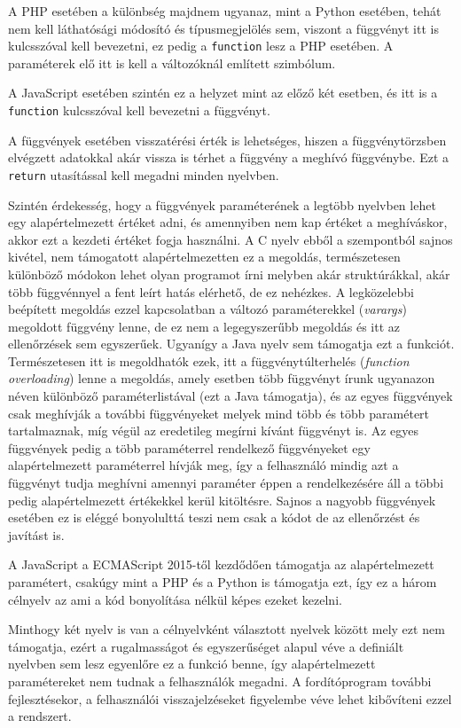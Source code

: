 A PHP esetében a különbség majdnem ugyanaz, mint a Python esetében, tehát nem kell láthatósági módosító és típusmegjelölés sem, viszont a függvényt itt is kulcsszóval kell bevezetni, ez pedig a \texttt{function} lesz a PHP esetében. A paraméterek elő itt is kell a változóknál említett \textdollar szimbólum.

A JavaScript esetében szintén ez a helyzet mint az előző két esetben, és itt is a \texttt{function} kulcsszóval kell bevezetni a függvényt.

A függvények esetében visszatérési érték is lehetséges, hiszen a függvénytörzsben elvégzett adatokkal akár vissza is térhet a függvény a meghívó függvénybe. Ezt a \texttt{return} utasítással kell megadni minden nyelvben.

Szintén érdekesség, hogy a függvények paraméterének a legtöbb nyelvben lehet egy alapértelmezett értéket adni, és amennyiben nem kap értéket a meghíváskor, akkor ezt a kezdeti értéket fogja használni.
A C nyelv ebből a szempontból sajnos kivétel, nem támogatott alapértelmezetten ez a megoldás, természetesen különböző módokon lehet olyan programot írni melyben akár struktúrákkal, akár több függvénnyel a fent leírt hatás elérhető, de ez nehézkes. A legközelebbi beépített megoldás ezzel kapcsolatban a változó paraméterekkel (\textit{varargs}) megoldott függvény lenne, de ez nem a legegyszerűbb megoldás és itt az ellenőrzések sem egyszerűek.
Ugyanígy a Java nyelv sem támogatja ezt a funkciót. Természetesen itt is megoldhatók ezek, itt a függvénytúlterhelés (\textit{function overloading}) lenne a megoldás, amely esetben több függvényt írunk ugyanazon néven különböző paraméterlistával (ezt a Java támogatja), és az egyes függvények csak meghívják a további függvényeket melyek mind több és több paramétert tartalmaznak, míg végül az eredetileg megírni kívánt függvényt is. Az egyes függvények pedig a több paraméterrel rendelkező függvényeket egy alapértelmezett paraméterrel hívják meg, így a felhasználó mindig azt a függvényt tudja meghívni amennyi paraméter éppen a rendelkezésére áll a többi pedig alapértelmezett értékekkel kerül kitöltésre. Sajnos a nagyobb függvények esetében ez is eléggé bonyolulttá teszi nem csak a kódot de az ellenőrzést és javítást is.

A JavaScript a ECMAScript 2015-től kezdődően támogatja az alapértelmezett paramétert, csakúgy mint a PHP és a Python is támogatja ezt, így ez a három célnyelv az ami a kód bonyolítása nélkül képes ezeket kezelni.

Minthogy két nyelv is van a célnyelvként választott nyelvek között mely ezt nem támogatja, ezért a rugalmasságot és egyszerűséget alapul véve a definiált nyelvben sem lesz egyenlőre ez a funkció benne, így alapértelmezett paramétereket nem tudnak a felhasználók megadni. A fordítóprogram további fejlesztésekor, a felhasználói visszajelzéseket figyelembe véve lehet kibővíteni ezzel a rendszert.

